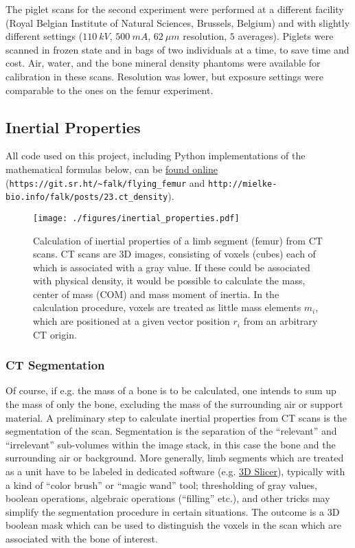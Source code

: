 The piglet scans for the second experiment were performed at a different facility (Royal Belgian Institute of Natural Sciences, Brussels, Belgium) and with slightly different settings (\(110\ kV\), \(500\ mA\), \(62\ \mu m\) resolution, \(5\) averages).
Piglets were scanned in frozen state and in bags of two individuals at a time, to save time and cost.
Air, water, and the bone mineral density phantoms were available for calibration in these scans.
Resolution was lower, but exposure settings were comparable to the ones on the femur experiment.


\subsection{Inertial Properties}
\label{sec:orga730610}

All code used on this project, including Python implementations of the mathematical formulas below, can be \href{https://git.sr.ht/\~falk/flying\_femur}{found online} (\nolinkurl{https://git.sr.ht/~falk/flying_femur} and \nolinkurl{http://mielke-bio.info/falk/posts/23.ct_density}).

\begin{figure}[p]
\centering
\texttt{[image: ./figures/inertial\_properties.pdf]}
\caption{\label{fig:inertials}Calculation of inertial properties of a limb segment (femur) from CT scans. CT scans are 3D images, consisting of voxels (cubes) each of which is associated with a gray value. If these could be associated with physical density, it would be possible to calculate the mass, center of mass (COM) and mass moment of inertia. In the calculation procedure, voxels are treated as little mass elements \(m_{i}\), which are positioned at a given vector position \(r_{i}\) from an arbitrary CT origin.}
\end{figure}

\subsubsection{CT Segmentation}
\label{sec:orgf6124ec}
Of course, if e.g. the mass of a bone is to be calculated, one intends to sum up the mass of only the bone, excluding the mass of the surrounding air or support material.
A preliminary step to calculate inertial properties from CT scans is the segmentation of the scan.
Segmentation is the separation of the ``relevant'' and ``irrelevant'' sub-volumes within the image stack, in this case the bone and the surrounding air or background.
More generally, limb segments which are treated as a unit have to be labeled in dedicated software (e.g. \href{https://www.slicer.org}{3D Slicer}), typically with a kind of ``color brush'' or ``magic wand'' tool; thresholding of gray values, boolean operations, algebraic operations (``filling'' etc.), and other tricks may simplify the segmentation procedure in certain situations.
The outcome is a 3D boolean mask which can be used to distinguish the voxels in the scan which are associated with the bone of interest.


